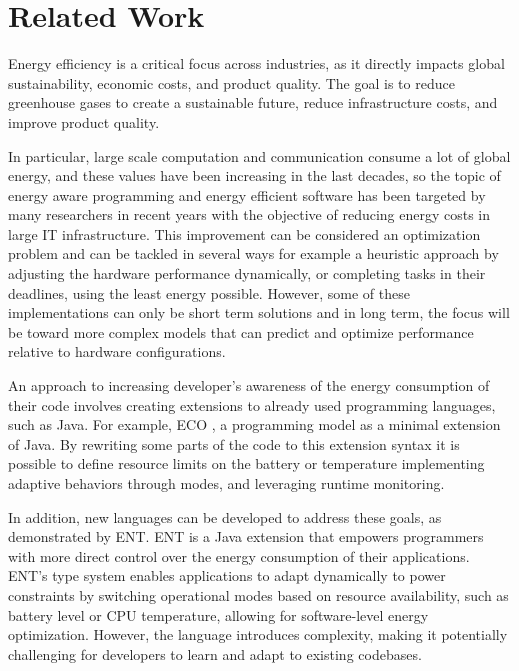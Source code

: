 \documentclass[sigplan]{acmart}
\begin{document}
\section{Related Work} \label{sec:relatedwork}

Energy efficiency is a critical focus across industries, as it directly impacts global sustainability, economic costs, and product quality.  The goal is to reduce greenhouse gases to create a sustainable future, reduce infrastructure costs, and improve product quality\cite{annurev:/content/journals/10.1146/annurev.resource.102308.124234}. 

In particular, large scale computation and communication consume a lot of global energy, and these values have been increasing in the last decades, so the topic of energy aware programming and energy efficient software has been targeted by many researchers in recent years with the objective of reducing energy costs in large IT infrastructure\cite{8880037}.
This improvement can be considered an optimization problem and can be tackled in several ways for example a heuristic approach by adjusting the hardware performance dynamically, or completing tasks in their deadlines, using the least energy possible. However, some of these implementations can only be short term solutions and in long term, the focus will be toward more complex models that can predict and optimize performance relative to hardware configurations\cite{10.1145/1666420.1666438}. 

An approach to increasing developer's awareness of the energy consumption of their code involves creating extensions to already used programming languages, such as Java. For example, ECO \cite{7194624}, a programming model as a minimal extension of Java. By rewriting some parts of the code to this extension syntax it is possible to define resource limits on the battery or temperature implementing adaptive behaviors through modes, and leveraging runtime monitoring.

In addition, new languages can be developed to address these goals, as demonstrated by ENT\cite{10.1145/3062341.3062356}. ENT is a Java extension that empowers programmers with more direct control over the energy consumption of their applications. ENT’s type system enables applications to adapt dynamically to power constraints by switching operational modes based on resource availability, such as battery level or CPU temperature, allowing for software-level energy optimization. However, the language introduces complexity, making it potentially challenging for developers to learn and adapt to existing codebases. 
\end{document}
